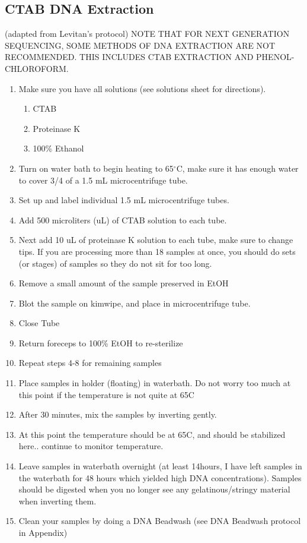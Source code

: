 \documentclass[11pt, oneside]{article}
\begin{document}
	\newpage 

	\subsection{CTAB DNA Extraction}
		(adapted from Levitan's protocol)
		NOTE THAT FOR NEXT GENERATION SEQUENCING, SOME METHODS OF DNA EXTRACTION ARE NOT RECOMMENDED.  THIS INCLUDES CTAB EXTRACTION AND PHENOL-CHLOROFORM.

		\begin{enumerate}	
		\itemsep0em
			\item Make sure you have all solutions (see solutions sheet for directions). 
			\begin{enumerate}
			\itemsep0em
				\item CTAB
				\item Proteinase K
				\item 100\% Ethanol
			\end{enumerate}
			\item Turn on water bath to begin heating to 65$^{\circ}$C, make sure it has enough water to cover 3/4 of a 1.5 mL microcentrifuge tube. 
			\item Set up and label individual 1.5 mL microcentrifuge tubes.
			\item Add 500 microliters (uL) of CTAB solution to each tube. 
			\item Next add 10 uL of proteinase K solution to each tube, make sure to change tips. If you are processing more than 18 samples at once, 			you should do sets (or stages) of samples so they do not sit for too long. 
			\item Remove a small amount of the sample preserved in EtOH
			\item Blot the sample on kimwipe, and place in microcentrifuge tube. 
			\item Close Tube
			\item Return foreceps to 100\% EtOH to re-sterilize
			\item Repeat steps 4-8 for remaining samples
			\item Place samples in holder (floating) in waterbath. Do not worry too much at this point if the temperature is not quite at 65C
			\item After 30 minutes, mix the samples by inverting gently. 
			\item At this point the temperature should be at 65C, and should be stabilized here.. continue to monitor temperature. 
			\item Leave samples in waterbath overnight (at least 14hours, I have left samples in the waterbath for 48 hours which yielded high DNA 				concentrations). Samples should be digested when you no longer see any gelatinous/stringy material when inverting them.  
			\item Clean your samples by doing a DNA Beadwash (see DNA Beadwash protocol in Appendix)

		\end{enumerate}
\end{document}
